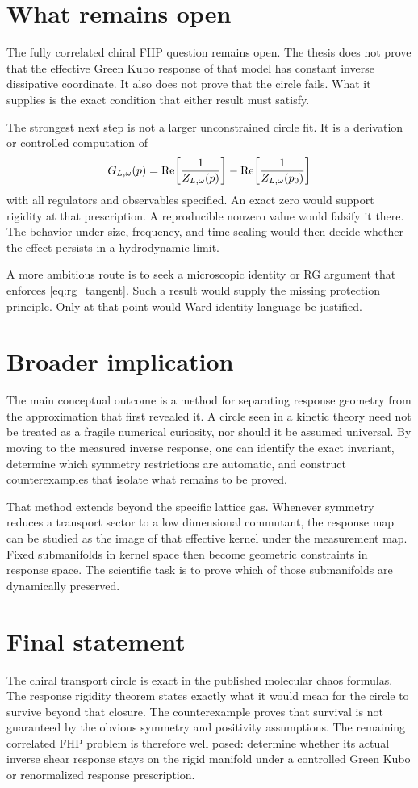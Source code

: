 \section{What remains open}
The fully correlated chiral FHP question remains open. The thesis does not prove that the effective Green Kubo response of that model has constant inverse dissipative coordinate. It also does not prove that the circle fails. What it supplies is the exact condition that either result must satisfy.

The strongest next step is not a larger unconstrained circle fit. It is a derivation or controlled computation of
\begin{equation}
 G_{L,\omega}(p)=
 \operatorname{Re}\!\left[\frac1{Z_{L,\omega}(p)}\right]
 -\operatorname{Re}\!\left[\frac1{Z_{L,\omega}(p_0)}\right]
 \label{eq:conclusion_g}
\end{equation}
with all regulators and observables specified. An exact zero would support rigidity at that prescription. A reproducible nonzero value would falsify it there. The behavior under size, frequency, and time scaling would then decide whether the effect persists in a hydrodynamic limit.

A more ambitious route is to seek a microscopic identity or RG argument that enforces \cref{eq:rg_tangent}. Such a result would supply the missing protection principle. Only at that point would Ward identity language be justified.

\section{Broader implication}
The main conceptual outcome is a method for separating response geometry from the approximation that first revealed it. A circle seen in a kinetic theory need not be treated as a fragile numerical curiosity, nor should it be assumed universal. By moving to the measured inverse response, one can identify the exact invariant, determine which symmetry restrictions are automatic, and construct counterexamples that isolate what remains to be proved.

That method extends beyond the specific lattice gas. Whenever symmetry reduces a transport sector to a low dimensional commutant, the response map can be studied as the image of that effective kernel under the measurement map. Fixed submanifolds in kernel space then become geometric constraints in response space. The scientific task is to prove which of those submanifolds are dynamically preserved.

\section{Final statement}
The chiral transport circle is exact in the published molecular chaos formulas. The response rigidity theorem states exactly what it would mean for the circle to survive beyond that closure. The counterexample proves that survival is not guaranteed by the obvious symmetry and positivity assumptions. The remaining correlated FHP problem is therefore well posed: determine whether its actual inverse shear response stays on the rigid manifold under a controlled Green Kubo or renormalized response prescription.
